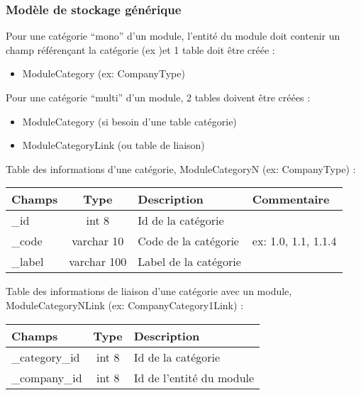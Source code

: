 \subsubsection{Modèle de stockage générique}

Pour une catégorie ``mono'' d'un module, l'entité du module doit contenir un champ référençant la catégorie  (ex )et 1 table doit être créée :\\

\begin{itemize}
\item ModuleCategory (ex: CompanyType)
\end{itemize}
\vspace{0.3cm}

Pour une catégorie ``multi'' d'un module, 2 tables doivent être créées :\\

\begin{itemize}
\item ModuleCategory (si besoin d'une table catégorie)
\item ModuleCategoryLink (ou table de liaison)
\end{itemize}
\vspace{0.3cm}

Table des informations d'une catégorie, ModuleCategoryN (ex: CompanyType) :\\

\begin{tabular}{|p{3cm}|c|p{4cm}|p{4cm}|}
\hline
\textbf{Champs} & \textbf{Type} & \textbf{Description} & \textbf{Commentaire} \\
\hline
\_id & int 8 & Id de la catégorie & \\
\hline
\_code & varchar 10 & Code de la catégorie & ex: 1.0, 1.1, 1.1.4 \\
\hline
\_label & varchar 100 & Label de la catégorie & \\
\hline
\end{tabular}
\vspace{0.3cm}

Table des informations de liaison d'une catégorie avec un module, ModuleCategoryNLink (ex: CompanyCategory1Link) :\\

\begin{tabular}{|p{3cm}|c|p{4cm}|}
\hline
\textbf{Champs} & \textbf{Type} & \textbf{Description}\\
\hline
\_category\_id & int 8 & Id de la catégorie\\
\hline
\_company\_id & int 8 & Id de l'entité du module\\
\hline
\end{tabular}


